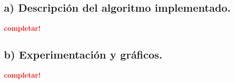 \subsection{a) Descripción del algoritmo implementado.}
\vspace*{0.3cm}
\textcolor{red}{\textbf{completar!}}



\newpage
\subsection{b) Experimentación y gráficos.}
\vspace*{0.3cm}
\textcolor{red}{\textbf{completar!}}
